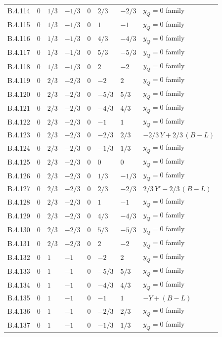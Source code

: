 {\begin{longtable}{@{}lllllll>{\raggedright\arraybackslash}p{5.6cm}@{}}
B.4.114 & $0$ & $1/3$ & $-1/3$ & $0$ & $2/3$ & $-2/3$ & $y_Q=0$ family \\
B.4.115 & $0$ & $1/3$ & $-1/3$ & $0$ & $1$ & $-1$ & $y_Q=0$ family \\
B.4.116 & $0$ & $1/3$ & $-1/3$ & $0$ & $4/3$ & $-4/3$ & $y_Q=0$ family \\
B.4.117 & $0$ & $1/3$ & $-1/3$ & $0$ & $5/3$ & $-5/3$ & $y_Q=0$ family \\
B.4.118 & $0$ & $1/3$ & $-1/3$ & $0$ & $2$ & $-2$ & $y_Q=0$ family \\
B.4.119 & $0$ & $2/3$ & $-2/3$ & $0$ & $-2$ & $2$ & $y_Q=0$ family \\
B.4.120 & $0$ & $2/3$ & $-2/3$ & $0$ & $-5/3$ & $5/3$ & $y_Q=0$ family \\
B.4.121 & $0$ & $2/3$ & $-2/3$ & $0$ & $-4/3$ & $4/3$ & $y_Q=0$ family \\
B.4.122 & $0$ & $2/3$ & $-2/3$ & $0$ & $-1$ & $1$ & $y_Q=0$ family \\
B.4.123 & $0$ & $2/3$ & $-2/3$ & $0$ & $-2/3$ & $2/3$ & $-2/3\,Y+2/3\,(B{-}L)$ \\
B.4.124 & $0$ & $2/3$ & $-2/3$ & $0$ & $-1/3$ & $1/3$ & $y_Q=0$ family \\
B.4.125 & $0$ & $2/3$ & $-2/3$ & $0$ & $0$ & $0$ & $y_Q=0$ family \\
B.4.126 & $0$ & $2/3$ & $-2/3$ & $0$ & $1/3$ & $-1/3$ & $y_Q=0$ family \\
B.4.127 & $0$ & $2/3$ & $-2/3$ & $0$ & $2/3$ & $-2/3$ & $2/3\,Y'-2/3\,(B{-}L)$ \\
B.4.128 & $0$ & $2/3$ & $-2/3$ & $0$ & $1$ & $-1$ & $y_Q=0$ family \\
B.4.129 & $0$ & $2/3$ & $-2/3$ & $0$ & $4/3$ & $-4/3$ & $y_Q=0$ family \\
B.4.130 & $0$ & $2/3$ & $-2/3$ & $0$ & $5/3$ & $-5/3$ & $y_Q=0$ family \\
B.4.131 & $0$ & $2/3$ & $-2/3$ & $0$ & $2$ & $-2$ & $y_Q=0$ family \\
B.4.132 & $0$ & $1$ & $-1$ & $0$ & $-2$ & $2$ & $y_Q=0$ family \\
B.4.133 & $0$ & $1$ & $-1$ & $0$ & $-5/3$ & $5/3$ & $y_Q=0$ family \\
B.4.134 & $0$ & $1$ & $-1$ & $0$ & $-4/3$ & $4/3$ & $y_Q=0$ family \\
B.4.135 & $0$ & $1$ & $-1$ & $0$ & $-1$ & $1$ & $-Y+(B{-}L)$ \\
B.4.136 & $0$ & $1$ & $-1$ & $0$ & $-2/3$ & $2/3$ & $y_Q=0$ family \\
B.4.137 & $0$ & $1$ & $-1$ & $0$ & $-1/3$ & $1/3$ & $y_Q=0$ family \\

\end{longtable}}

